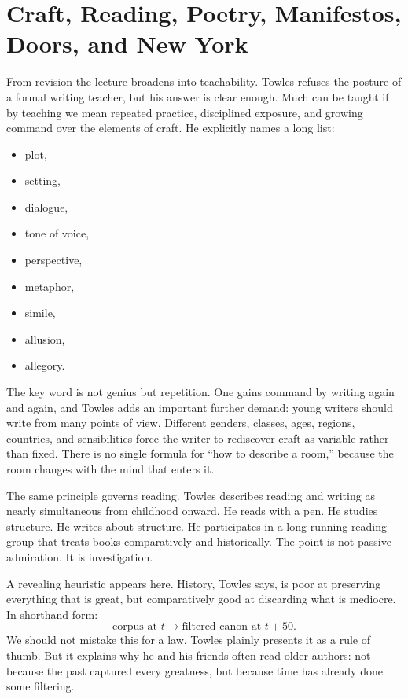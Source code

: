 \section{Craft, Reading, Poetry, Manifestos, Doors, and New York}

From revision the lecture broadens into teachability. Towles refuses the posture of a formal writing teacher, but his answer is clear enough. Much can be taught if by teaching we mean repeated practice, disciplined exposure, and growing command over the elements of craft. He explicitly names a long list:
\begin{itemize}
\item plot,
\item setting,
\item dialogue,
\item tone of voice,
\item perspective,
\item metaphor,
\item simile,
\item allusion,
\item allegory.
\end{itemize}
The key word is not genius but repetition. One gains command by writing again and again, and Towles adds an important further demand: young writers should write from many points of view. Different genders, classes, ages, regions, countries, and sensibilities force the writer to rediscover craft as variable rather than fixed. There is no single formula for ``how to describe a room,'' because the room changes with the mind that enters it.

The same principle governs reading. Towles describes reading and writing as nearly simultaneous from childhood onward. He reads with a pen. He studies structure. He writes about structure. He participates in a long-running reading group that treats books comparatively and historically. The point is not passive admiration. It is investigation.

A revealing heuristic appears here. History, Towles says, is poor at preserving everything that is great, but comparatively good at discarding what is mediocre. In shorthand form:
\begin{equation}
\text{corpus at } t \longrightarrow \text{filtered canon at } t+50.
\end{equation}
We should not mistake this for a law. Towles plainly presents it as a rule of thumb. But it explains why he and his friends often read older authors: not because the past captured every greatness, but because time has already done some filtering.

